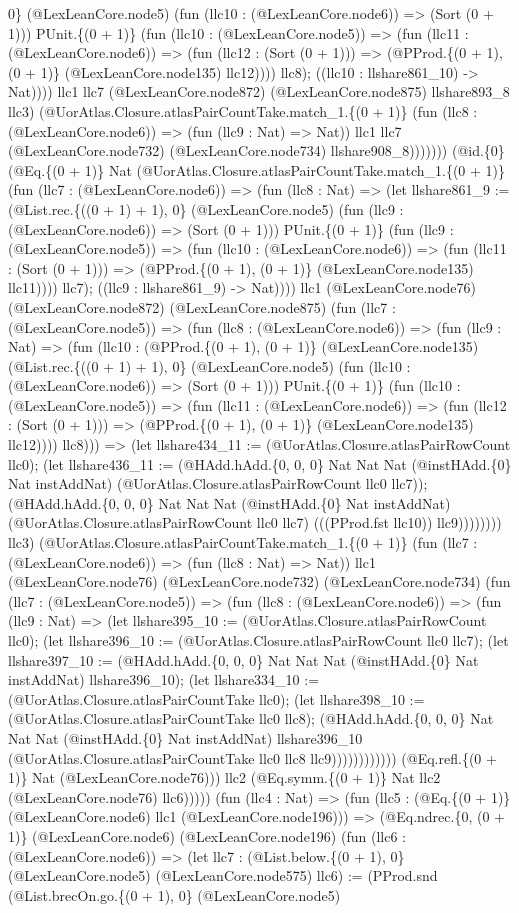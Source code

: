 \documentclass[11pt]{article}
\begin{document}
0\} (@LexLeanCore.node5) (fun (llc10 : (@LexLeanCore.node6)) => (Sort (0 + 1))) PUnit.\{(0 + 1)\} (fun (llc10 : (@LexLeanCore.node5)) => (fun (llc11 : (@LexLeanCore.node6)) => (fun (llc12 : (Sort (0 + 1))) => (@PProd.\{(0 + 1), (0 + 1)\} (@LexLeanCore.node135) llc12)))) llc8); ((llc10 : llshare861\_10) -> Nat)))) llc1 llc7 (@LexLeanCore.node872) (@LexLeanCore.node875) llshare893\_8 llc3) (@UorAtlas.Closure.atlasPairCountTake.match\_1.\{(0 + 1)\} (fun (llc8 : (@LexLeanCore.node6)) => (fun (llc9 : Nat) => Nat)) llc1 llc7 (@LexLeanCore.node732) (@LexLeanCore.node734) llshare908\_8))))))) (@id.\{0\} (@Eq.\{(0 + 1)\} Nat (@UorAtlas.Closure.atlasPairCountTake.match\_1.\{(0 + 1)\} (fun (llc7 : (@LexLeanCore.node6)) => (fun (llc8 : Nat) => (let llshare861\_9 := (@List.rec.\{((0 + 1) + 1), 0\} (@LexLeanCore.node5) (fun (llc9 : (@LexLeanCore.node6)) => (Sort (0 + 1))) PUnit.\{(0 + 1)\} (fun (llc9 : (@LexLeanCore.node5)) => (fun (llc10 : (@LexLeanCore.node6)) => (fun (llc11 : (Sort (0 + 1))) => (@PProd.\{(0 + 1), (0 + 1)\} (@LexLeanCore.node135) llc11)))) llc7); ((llc9 : llshare861\_9) -> Nat)))) llc1 (@LexLeanCore.node76) (@LexLeanCore.node872) (@LexLeanCore.node875) (fun (llc7 : (@LexLeanCore.node5)) => (fun (llc8 : (@LexLeanCore.node6)) => (fun (llc9 : Nat) => (fun (llc10 : (@PProd.\{(0 + 1), (0 + 1)\} (@LexLeanCore.node135) (@List.rec.\{((0 + 1) + 1), 0\} (@LexLeanCore.node5) (fun (llc10 : (@LexLeanCore.node6)) => (Sort (0 + 1))) PUnit.\{(0 + 1)\} (fun (llc10 : (@LexLeanCore.node5)) => (fun (llc11 : (@LexLeanCore.node6)) => (fun (llc12 : (Sort (0 + 1))) => (@PProd.\{(0 + 1), (0 + 1)\} (@LexLeanCore.node135) llc12)))) llc8))) => (let llshare434\_11 := (@UorAtlas.Closure.atlasPairRowCount llc0); (let llshare436\_11 := (@HAdd.hAdd.\{0, 0, 0\} Nat Nat Nat (@instHAdd.\{0\} Nat instAddNat) (@UorAtlas.Closure.atlasPairRowCount llc0 llc7)); (@HAdd.hAdd.\{0, 0, 0\} Nat Nat Nat (@instHAdd.\{0\} Nat instAddNat) (@UorAtlas.Closure.atlasPairRowCount llc0 llc7) (((PProd.fst llc10)) llc9)))))))) llc3) (@UorAtlas.Closure.atlasPairCountTake.match\_1.\{(0 + 1)\} (fun (llc7 : (@LexLeanCore.node6)) => (fun (llc8 : Nat) => Nat)) llc1 (@LexLeanCore.node76) (@LexLeanCore.node732) (@LexLeanCore.node734) (fun (llc7 : (@LexLeanCore.node5)) => (fun (llc8 : (@LexLeanCore.node6)) => (fun (llc9 : Nat) => (let llshare395\_10 := (@UorAtlas.Closure.atlasPairRowCount llc0); (let llshare396\_10 := (@UorAtlas.Closure.atlasPairRowCount llc0 llc7); (let llshare397\_10 := (@HAdd.hAdd.\{0, 0, 0\} Nat Nat Nat (@instHAdd.\{0\} Nat instAddNat) llshare396\_10); (let llshare334\_10 := (@UorAtlas.Closure.atlasPairCountTake llc0); (let llshare398\_10 := (@UorAtlas.Closure.atlasPairCountTake llc0 llc8); (@HAdd.hAdd.\{0, 0, 0\} Nat Nat Nat (@instHAdd.\{0\} Nat instAddNat) llshare396\_10 (@UorAtlas.Closure.atlasPairCountTake llc0 llc8 llc9)))))))))))) (@Eq.refl.\{(0 + 1)\} Nat (@LexLeanCore.node76))) llc2 (@Eq.symm.\{(0 + 1)\} Nat llc2 (@LexLeanCore.node76) llc6))))) (fun (llc4 : Nat) => (fun (llc5 : (@Eq.\{(0 + 1)\} (@LexLeanCore.node6) llc1 (@LexLeanCore.node196))) => (@Eq.ndrec.\{0, (0 + 1)\} (@LexLeanCore.node6) (@LexLeanCore.node196) (fun (llc6 : (@LexLeanCore.node6)) => (let llc7 : (@List.below.\{(0 + 1), 0\} (@LexLeanCore.node5) (@LexLeanCore.node575) llc6) := (PProd.snd (@List.brecOn.go.\{(0 + 1), 0\} (@LexLeanCore.node5) 
\end{document}
